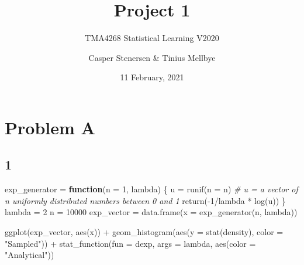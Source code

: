 \documentclass[
]{article}
\title{Project 1}
\subtitle{TMA4268 Statistical Learning V2020}
\author{Casper Stenersen \& Tinius Mellbye}
\date{11 February, 2021}
\newenvironment{Shaded}{\begin{snugshade}}{\end{snugshade}}
\newcommand{\AttributeTok}[1]{\textcolor[rgb]{0.77,0.63,0.00}{#1}}
\newcommand{\CommentTok}[1]{\textcolor[rgb]{0.56,0.35,0.01}{\textit{#1}}}
\newcommand{\ControlFlowTok}[1]{\textcolor[rgb]{0.13,0.29,0.53}{\textbf{#1}}}
\newcommand{\DecValTok}[1]{\textcolor[rgb]{0.00,0.00,0.81}{#1}}
\newcommand{\FunctionTok}[1]{\textcolor[rgb]{0.00,0.00,0.00}{#1}}
\newcommand{\NormalTok}[1]{#1}
\newcommand{\OtherTok}[1]{\textcolor[rgb]{0.56,0.35,0.01}{#1}}
\newcommand{\SpecialCharTok}[1]{\textcolor[rgb]{0.00,0.00,0.00}{#1}}
\newcommand{\StringTok}[1]{\textcolor[rgb]{0.31,0.60,0.02}{#1}}
\begin{document}
\maketitle

\hypertarget{problem-a}{%
\section{Problem A}\label{problem-a}}

\hypertarget{section}{%
\subsection{1}\label{section}}

\begin{Shaded}
\begin{Highlighting}[]
\NormalTok{exp\_generator }\OtherTok{=} \ControlFlowTok{function}\NormalTok{(}\AttributeTok{n =} \DecValTok{1}\NormalTok{, lambda) \{}
\NormalTok{    u }\OtherTok{=} \FunctionTok{runif}\NormalTok{(}\AttributeTok{n =}\NormalTok{ n)  }\CommentTok{\# u = a vector of n uniformly distributed numbers between 0 and 1}
    \FunctionTok{return}\NormalTok{(}\SpecialCharTok{{-}}\DecValTok{1}\SpecialCharTok{/}\NormalTok{lambda }\SpecialCharTok{*} \FunctionTok{log}\NormalTok{(u))}
\NormalTok{\}}
\NormalTok{lambda }\OtherTok{=} \DecValTok{2}
\NormalTok{n }\OtherTok{=} \DecValTok{10000}
\NormalTok{exp\_vector }\OtherTok{=} \FunctionTok{data.frame}\NormalTok{(}\AttributeTok{x =} \FunctionTok{exp\_generator}\NormalTok{(n, lambda))}


\FunctionTok{ggplot}\NormalTok{(exp\_vector, }\FunctionTok{aes}\NormalTok{(x)) }\SpecialCharTok{+} \FunctionTok{geom\_histogram}\NormalTok{(}\FunctionTok{aes}\NormalTok{(}\AttributeTok{y =} \FunctionTok{stat}\NormalTok{(density), }\AttributeTok{color =} \StringTok{"Sampled"}\NormalTok{)) }\SpecialCharTok{+} 
    \FunctionTok{stat\_function}\NormalTok{(}\AttributeTok{fun =}\NormalTok{ dexp, }\AttributeTok{args =}\NormalTok{ lambda, }\FunctionTok{aes}\NormalTok{(}\AttributeTok{color =} \StringTok{"Analytical"}\NormalTok{))}
\end{Highlighting}
\end{Shaded}
\end{document}
